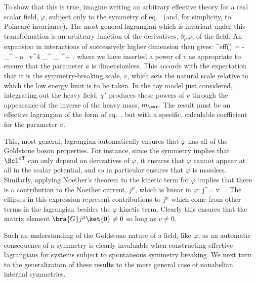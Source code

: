 \documentclass[12pt,epsf]{report}
\def\leff{\Scl^{\rm eff}}
\begin{document}
To show that this is true, imagine writing an arbitrary
effective theory for a real scalar field, $\varphi$,
subject only to the symmetry of eq.~
(and, for simplicity, to Poincar\'e invariance).  The most
general lagrangian which is invariant under this
transformation is an arbitrary function of the derivatives,
$\partial_\mu\varphi$, of the field. An expansion in
interactions of successively higher dimension then gives:
%
\eq
\label{abelgbaction}
\leff(\varphi) = - \hf \; \partial_\mu \varphi \partial^\mu
\varphi - {a \, v^4} \;  \partial_\mu \varphi \partial^\mu \varphi \;
\partial_\nu \varphi
\partial^\nu \varphi + \cdots,
\eeq
%
where we have inserted a power of $v$ as appropriate to
ensure that the parameter $a$ is dimensionless. This
accords with the expectation that it is the
symmetry-breaking scale, $v$, which sets the natural scale
relative to which the low energy limit is to be taken. In
the toy model just considered, integrating out the heavy
field, $\chi'$ produces these powers of $v$ through the
appearance of the inverse of the heavy mass, $m_\ssr$. The
result must be an effective lagrangian of the form of 
eq.~, but with a specific, calculable
coefficient for the parameter $a$.

This, most general, lagrangian automatically ensures that
$\varphi$ has all of the Goldstone boson properties. For
instance, since the symmetry implies that $\leff$ can only
depend on derivatives of 
$\varphi$, it ensures that $\varphi$ cannot appear at all
in the scalar potential, and so in particular ensures that
$\varphi$ is massless. Similarly, applying Noether's
theorem to the kinetic term for $\varphi$ implies that
there is a contribution to the Noether current, $j^\mu$,
which is linear in $\varphi$: 
%
\eq
\label{abelgbncex}
j^\mu =  \; v \;  \, . \eeq
%
The ellipses in this expression represent contributions to
$j^\mu$ which come from other terms in the lagrangian
besides the 
$\varphi$ kinetic term. Clearly this ensures that the
matrix element $\bra{G} j^\mu \ket{0} \neq 0$ so long as $v
\neq 0$.

Such an understanding of the Goldstone nature of a field,
like 
$\varphi$, as an automatic consequence of a symmetry is
clearly invaluable when constructing effective lagrangians
for systems subject to spontaneous symmetry breaking. We
next turn to the generalization of these results to the
more general case of nonabelian internal symmetries.
\end{document}
